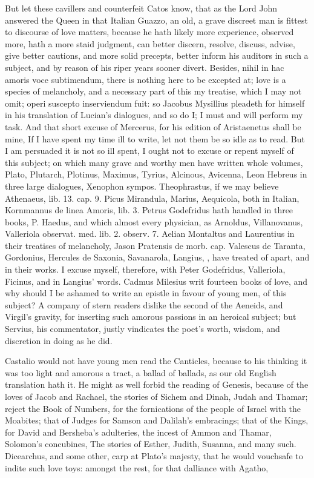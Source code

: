 {But let these cavillers and counterfeit Catos know, that as the Lord
John answered the Queen in that Italian Guazzo, an old, a grave
discreet man is fittest to discourse of love matters, because he hath
likely more experience, observed more, hath a more staid judgment, can
better discern, resolve, discuss, advise, give better cautions, and
more solid precepts, better inform his auditors in such a subject, and
by reason of his riper years sooner divert. Besides, nihil in hac
amoris voce subtimendum, there is nothing here to be excepted at; love
is a species of melancholy, and a necessary part of this my treatise,
which I may not omit; operi suscepto inserviendum fuit: so Jacobus
Mysillius pleadeth for himself in his translation of Lucian's
dialogues, and so do I; I must and will perform my task. And that short
excuse of Mercerus, for his edition of Aristaenetus shall be mine,
If I have spent my time ill to write, let not them be so idle as
to read. But I am persuaded it is not so ill spent, I ought not to
excuse or repent myself of this subject; on which many grave and worthy
men have written whole volumes, Plato, Plutarch, Plotinus, Maximus,
Tyrius, Alcinous, Avicenna, Leon Hebreus in three large dialogues,
Xenophon sympos. Theophrastus, if we may believe Athenaeus, lib. 13.
cap. 9. Picus Mirandula, Marius, Aequicola, both in Italian, Kornmannus
de linea Amoris, lib. 3. Petrus Godefridus hath handled in three books,
P. Haedus, and which almost every physician, as Arnoldus, Villanovanus,
Valleriola observat. med. lib. 2. observ. 7. Aelian Montaltus and
Laurentius in their treatises of melancholy, Jason Pratensis de morb.
cap. Valescus de Taranta, Gordonius, Hercules de Saxonia, Savanarola,
Langius, \etc{}, have treated of apart, and in their works. I excuse
myself, therefore, with Peter Godefridus, Valleriola, Ficinus, and in
Langius' words. Cadmus Milesius writ fourteen books of love, and
why should I be ashamed to write an epistle in favour of young men, of
this subject? A company of stern readers dislike the second of the
Aeneids, and Virgil's gravity, for inserting such amorous passions in
an heroical subject; but Servius, his commentator, justly
vindicates the poet's worth, wisdom, and discretion in doing as he did.

Castalio would not have young men read the Canticles, because to
his thinking it was too light and amorous a tract, a ballad of ballads,
as our old English translation hath it. He might as well forbid the
reading of Genesis, because of the loves of Jacob and Rachael, the
stories of Sichem and Dinah, Judah and Thamar; reject the Book of
Numbers, for the fornications of the people of Israel with the
Moabites; that of Judges for Samson and Dalilah's embracings; that of
the Kings, for David and Bersheba's adulteries, the incest of Ammon and
Thamar, Solomon's concubines, \etc{} The stories of Esther, Judith,
Susanna, and many such. Dicearchus, and some other, carp at Plato's
majesty, that he would vouchsafe to indite such love toys: amongst the
rest, for that dalliance with Agatho,

}
